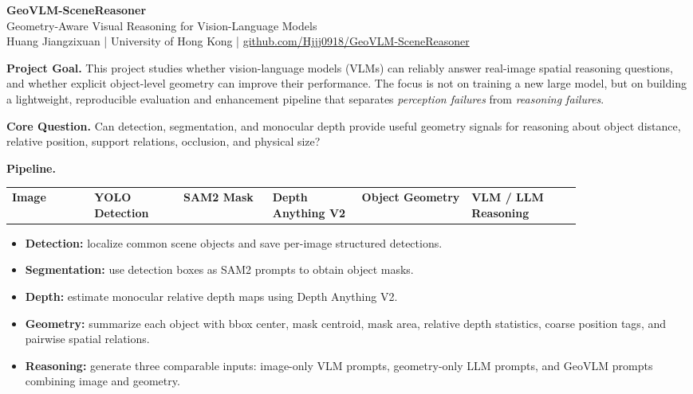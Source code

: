 \documentclass[10pt]{article}
\newcommand{\projecttitle}{GeoVLM-SceneReasoner}
\newcommand{\subtitle}{Geometry-Aware Visual Reasoning for Vision-Language Models}
\begin{document}
\begin{center}
{\Large \textbf{\projecttitle}}\\[-1pt]
{\normalsize \subtitle}\\
{\small Huang Jiangzixuan \quad | \quad University of Hong Kong \quad | \quad \href{https://github.com/Hjjj0918/GeoVLM-SceneReasoner}{github.com/Hjjj0918/GeoVLM-SceneReasoner}}
\end{center}

\vspace{-5pt}

\textbf{Project Goal.}
This project studies whether vision-language models (VLMs) can reliably answer real-image spatial reasoning questions, and whether explicit object-level geometry can improve their performance. The focus is not on training a new large model, but on building a lightweight, reproducible evaluation and enhancement pipeline that separates \textit{perception failures} from \textit{reasoning failures}.

\textbf{Core Question.}
Can detection, segmentation, and monocular depth provide useful geometry signals for reasoning about object distance, relative position, support relations, occlusion, and physical size?

\vspace{2pt}
\textbf{Pipeline.}
\begin{center}
\small
\begin{tabular}{>{\centering\arraybackslash}p{0.12\linewidth}>{\centering\arraybackslash}p{0.13\linewidth}>{\centering\arraybackslash}p{0.13\linewidth}>{\centering\arraybackslash}p{0.13\linewidth}>{\centering\arraybackslash}p{0.16\linewidth}>{\centering\arraybackslash}p{0.16\linewidth}}
\textbf{Image} & \textbf{YOLO Detection} & \textbf{SAM2 Mask} & \textbf{Depth Anything V2} & \textbf{Object Geometry} & \textbf{VLM / LLM Reasoning} \\
\end{tabular}
\end{center}

\vspace{-3pt}
\begin{itemize}
  \item \textbf{Detection:} localize common scene objects and save per-image structured detections.
  \item \textbf{Segmentation:} use detection boxes as SAM2 prompts to obtain object masks.
  \item \textbf{Depth:} estimate monocular relative depth maps using Depth Anything V2.
  \item \textbf{Geometry:} summarize each object with bbox center, mask centroid, mask area, relative depth statistics, coarse position tags, and pairwise spatial relations.
  \item \textbf{Reasoning:} generate three comparable inputs: image-only VLM prompts, geometry-only LLM prompts, and GeoVLM prompts combining image and geometry.
\end{itemize}
\end{document}
